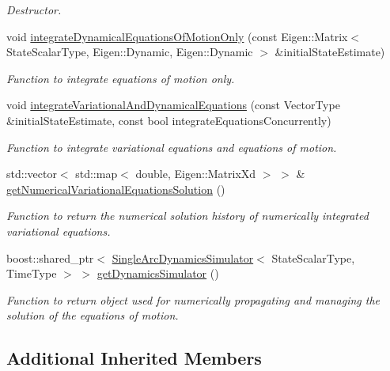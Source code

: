 \begin{DoxyCompactItemize}
\begin{DoxyCompactList}\small\item\em Destructor. \end{DoxyCompactList}\item 
void \hyperlink{classtudat_1_1propagators_1_1SingleArcVariationalEquationsSolver_a4539576388919b85435868ab187ddee3}{integrate\+Dynamical\+Equations\+Of\+Motion\+Only} (const Eigen\+::\+Matrix$<$ State\+Scalar\+Type, Eigen\+::\+Dynamic, Eigen\+::\+Dynamic $>$ \&initial\+State\+Estimate)
\begin{DoxyCompactList}\small\item\em Function to integrate equations of motion only. \end{DoxyCompactList}\item 
void \hyperlink{classtudat_1_1propagators_1_1SingleArcVariationalEquationsSolver_a38c4b0a4a9d7e93990de7433e31552f1}{integrate\+Variational\+And\+Dynamical\+Equations} (const Vector\+Type \&initial\+State\+Estimate, const bool integrate\+Equations\+Concurrently)
\begin{DoxyCompactList}\small\item\em Function to integrate variational equations and equations of motion. \end{DoxyCompactList}\item 
std\+::vector$<$ std\+::map$<$ double, Eigen\+::\+Matrix\+Xd $>$ $>$ \& \hyperlink{classtudat_1_1propagators_1_1SingleArcVariationalEquationsSolver_a9d7b655e4a9a18efaabb5d40d2b4b29a}{get\+Numerical\+Variational\+Equations\+Solution} ()
\begin{DoxyCompactList}\small\item\em Function to return the numerical solution history of numerically integrated variational equations. \end{DoxyCompactList}\item 
boost\+::shared\+\_\+ptr$<$ \hyperlink{classtudat_1_1propagators_1_1SingleArcDynamicsSimulator}{Single\+Arc\+Dynamics\+Simulator}$<$ State\+Scalar\+Type, Time\+Type $>$ $>$ \hyperlink{classtudat_1_1propagators_1_1SingleArcVariationalEquationsSolver_adcb28d96007868fb29a4f5f195283195}{get\+Dynamics\+Simulator} ()
\begin{DoxyCompactList}\small\item\em Function to return object used for numerically propagating and managing the solution of the equations of motion. \end{DoxyCompactList}\end{DoxyCompactItemize}
\subsection*{Additional Inherited Members}


